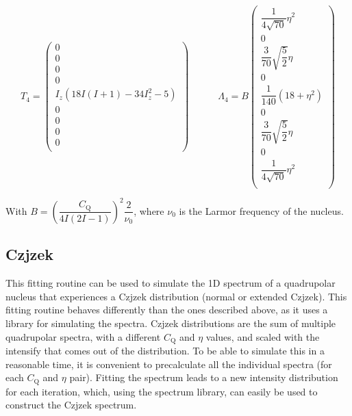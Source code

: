 \documentclass[11pt,a4paper]{article}
\begin{document}
\begin{equation}
  T_{4} = \left( \begin{array}{c}
0 \\
0 \\
0 \\
0 \\
I_z (18 I (I + 1) -34 I_z^2 -5) \\
0 \\
0\\
0 \\
0 \\
  \end{array} \right)
  \quad\quad\quad
  \Lambda_{4} = B
  \left( \begin{array}{c}
\dfrac{1}{4 \sqrt{70}} \eta^2 \\
0 \\
\dfrac{3}{70}  \sqrt{\dfrac{5}{2}} \eta\\
0 \\
 \dfrac{1}{140} (18  + \eta^2) \\
0 \\
\dfrac{3}{70}  \sqrt{\dfrac{5}{2}} \eta\\
0 \\
\dfrac{1}{4 \sqrt{70}} \eta^2 \\
  \end{array} \right)
\end{equation}


With $B = \left( \dfrac{C_\text{Q}}{4 I (2 I - 1)} \right) ^ 2  \dfrac{2}{\nu_0}$, where $\nu_0$ is
the Larmor frequency of the nucleus.

\subsection{Czjzek}
This fitting routine can be used to simulate the 1D spectrum of a quadrupolar nucleus that
experiences a Czjzek distribution (normal or extended Czjzek). This fitting routine behaves
differently than the ones described above, as it uses a library for simulating the spectra. Czjzek
distributions are the sum of multiple quadrupolar spectra, with a different $C_\text{Q}$ and $\eta$
values, and scaled with the intensify that comes out of the distribution. To be able to simulate
this in a reasonable time, it is convenient to precalculate all the individual spectra (for each
$C_\text{Q}$ and $\eta$ pair). Fitting the spectrum leads to a new intensity distribution for each
iteration, which, using the spectrum library, can easily be used to construct the Czjzek spectrum.
\end{document}
